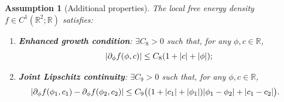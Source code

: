 \documentclass[]{article}
\newtheorem{assumption}{Assumption}
\newcommand{\R}{\mathbb{R}}
\DeclarePairedDelimiter{\abs}{\lvert}{\rvert}
\begin{document}
\begin{assumption}[Additional properties] \label{assump:free_energy_density2}
The local free energy density $f \in C^{1}(\R^2;\R)$ satisfies:\\[-0.5em]
\begin{enumerate}[label=\textup{(F\arabic*)}, ref=F\arabic*, start=5,leftmargin=.9cm] 
	\item \label{assump:growthenh} \textbf{Enhanced growth condition}: $\exists C_8>0$ such that, for any $\phi,c \in \R$,
	$$|\partial_\phi f(\phi,c)|\leq C_8(1+\abs{c}+\abs{\phi});$$
	\item \label{assump:lipenh} \textbf{Joint Lipschitz continuity}: $\exists C_9>0$ such that, for any $\phi,c \in \R$,
	\[\begin{aligned}
		|\partial_\phi f(\phi_1,c_1)-\partial_\phi f(\phi_2,c_2)|
		&\le C_9 \bigl( (1+\abs{c_1}+\abs{\phi_1})|\phi_1-\phi_2|+|c_1-c_2| \bigr).%
	\end{aligned}\]
\end{enumerate}
\end{assumption}
\end{document}
